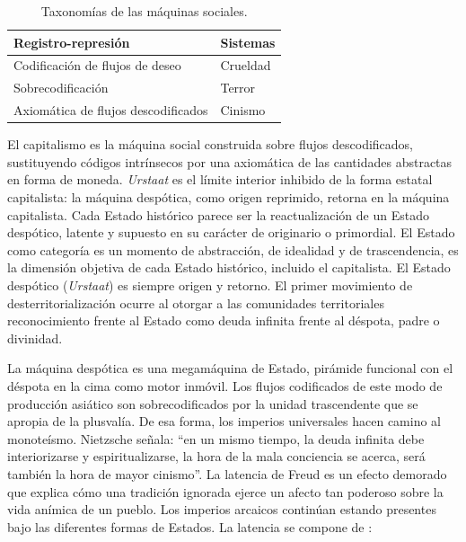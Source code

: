 \begin{table}[htb]
  \caption{Taxonomías de las máquinas sociales.} %
  \label{tab:tablename}
  \centering
  \begin{tabular}{ll}
    \toprule
    \textbf{Registro-represión} & \textbf{Sistemas}\\
    \midrule
    Codificación de flujos de deseo & Crueldad\\
    Sobrecodificación & Terror\\
    Axiomática de flujos descodificados & Cinismo\\
\bottomrule
  \end{tabular}
\end{table}

El capitalismo es la máquina social construida sobre flujos descodificados, sustituyendo códigos intrínsecos por una axiomática de las cantidades abstractas en forma de moneda. \emph{Urstaat} es el límite interior inhibido de la forma estatal capitalista: la máquina despótica, como origen reprimido, retorna en la máquina capitalista. Cada Estado histórico parece ser la reactualización de un Estado despótico, latente y supuesto en su carácter de originario o primordial. El Estado como categoría es un momento de abstracción, de idealidad y de trascendencia, es la dimensión objetiva de cada Estado histórico, incluido el capitalista. El Estado despótico (\emph{Urstaat}) es siempre origen y retorno. El primer movimiento de desterritorialización ocurre al otorgar a las comunidades territoriales reconocimiento frente al Estado como deuda infinita frente al déspota, padre o divinidad.

La máquina despótica es una megamáquina de Estado, pirámide funcional con el déspota en la cima como motor inmóvil. Los flujos codificados de este modo de producción asiático son sobrecodificados por la unidad trascendente que se apropia de la plusvalía. De esa forma, los imperios universales hacen camino al monoteísmo. Nietzsche señala: \enquote{en un mismo tiempo, la deuda infinita debe interiorizarse y espiritualizarse, la hora de la mala conciencia se acerca, será también la hora de mayor cinismo}. La latencia de Freud es un efecto demorado que explica cómo una tradición ignorada ejerce un afecto tan poderoso sobre la vida anímica de un pueblo. Los imperios arcaicos continúan estando presentes bajo las diferentes formas de Estados. La latencia se compone de \autocite{deleuzeAntiedipoCapitalismoEsquizofrenia2017}:

